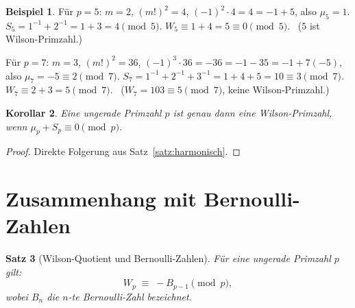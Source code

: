 \documentclass[12pt,a4paper]{amsart}
\newtheorem{theorem}{Satz}[section]
\newtheorem{korollar}[theorem]{Korollar}
\theoremstyle{definition}
\newtheorem{beispiel}[theorem]{Beispiel}
\begin{document}
\begin{beispiel}
  Für $p = 5$: $m = 2$, $(m!)^2 = 4$, $(-1)^2 \cdot 4 = 4 = -1 + 5$,
  also $\mu_5 = 1$.  $S_5 = 1^{-1} + 2^{-1} = 1 + 3 = 4 \pmod 5$.
  $W_5 \equiv 1 + 4 = 5 \equiv 0 \pmod 5$. \checkmark\ ($5$ ist Wilson-Primzahl.)

  Für $p = 7$: $m = 3$, $(m!)^2 = 36$, $(-1)^3 \cdot 36 = -36 = -1 - 35 = -1 + 7(-5)$,
  also $\mu_7 = -5 \equiv 2 \pmod 7$.
  $S_7 = 1^{-1}+2^{-1}+3^{-1} = 1+4+5 = 10 \equiv 3 \pmod 7$.
  $W_7 \equiv 2+3 = 5 \pmod 7$. \checkmark\ ($W_7 = 103 \equiv 5 \pmod 7$, keine Wilson-Primzahl.)
\end{beispiel}

\begin{korollar}\label{kor:wilson_primzahl_kriterium_2}
  Eine ungerade Primzahl $p$ ist genau dann eine Wilson-Primzahl, wenn
  $\mu_p + S_p \equiv 0 \pmod{p}$.
\end{korollar}

\begin{proof}
  Direkte Folgerung aus Satz~\ref{satz:harmonisch}.
\end{proof}

\section{Zusammenhang mit Bernoulli-Zahlen}

\begin{theorem}[Wilson-Quotient und Bernoulli-Zahlen]\label{satz:bernoulli}
  Für eine ungerade Primzahl $p$ gilt:
  \[
    W_p \;\equiv\; -B_{p-1} \pmod{p},
  \]
  wobei $B_n$ die $n$-te Bernoulli-Zahl bezeichnet.
\end{theorem}
\end{document}
